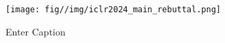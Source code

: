 \begin{figure}
    \centering
    \texttt{[image: fig//img/iclr2024\_main\_rebuttal.png]}
    \caption{Enter Caption}
    \label{fig:iclr2024_main_rebuttal}
\end{figure}
